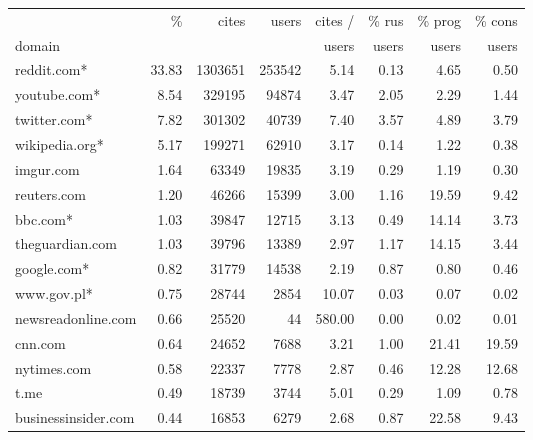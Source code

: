 \begin{tabular}{lrrrrrrr}
\toprule
{}     & \%      & cites    & users & cites / & \% rus & \% prog & \% cons \\
domain &         &          &       & users   & users   & users  & users   \\
\midrule
reddit.com*         &   33.83 &  1303651 &  253542 &         5.14 &         0.13 &          4.65 &          0.50 \\
youtube.com*        &    8.54 &   329195 &   94874 &         3.47 &         2.05 &          2.29 &          1.44 \\
twitter.com*        &    7.82 &   301302 &   40739 &         7.40 &         3.57 &          4.89 &          3.79 \\
wikipedia.org*      &    5.17 &   199271 &   62910 &         3.17 &         0.14 &          1.22 &          0.38 \\
imgur.com           &    1.64 &    63349 &   19835 &         3.19 &         0.29 &          1.19 &          0.30 \\
reuters.com         &    1.20 &    46266 &   15399 &         3.00 &         1.16 &         19.59 &          9.42 \\
bbc.com*            &    1.03 &    39847 &   12715 &         3.13 &         0.49 &         14.14 &          3.73 \\
theguardian.com     &    1.03 &    39796 &   13389 &         2.97 &         1.17 &         14.15 &          3.44 \\
google.com*         &    0.82 &    31779 &   14538 &         2.19 &         0.87 &          0.80 &          0.46 \\
www.gov.pl*         &    0.75 &    28744 &    2854 &        10.07 &         0.03 &          0.07 &          0.02 \\
newsreadonline.com  &    0.66 &    25520 &      44 &       580.00 &         0.00 &          0.02 &          0.01 \\
cnn.com             &    0.64 &    24652 &    7688 &         3.21 &         1.00 &         21.41 &         19.59 \\
nytimes.com         &    0.58 &    22337 &    7778 &         2.87 &         0.46 &         12.28 &         12.68 \\
t.me                &    0.49 &    18739 &    3744 &         5.01 &         0.29 &          1.09 &          0.78 \\
businessinsider.com &    0.44 &    16853 &    6279 &         2.68 &         0.87 &         22.58 &          9.43 \\

\end{tabular}
